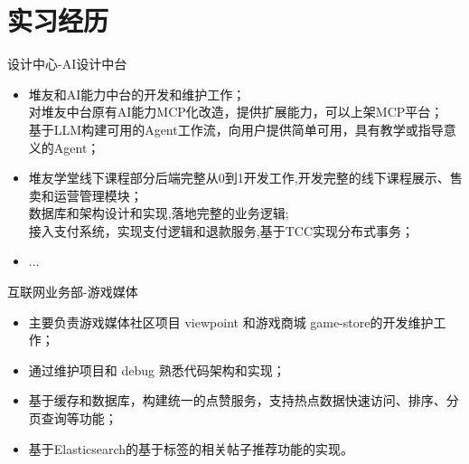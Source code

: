 \documentclass{resume}
\begin{document}
\section{实习经历}
\Content
{{设计中心-AI设计中台}}
{
    \begin{itemize}
        \item 堆友和AI能力中台的开发和维护工作；\\ 对堆友中台原有AI能力MCP化改造，提供扩展能力，可以上架MCP平台；\\ 基于LLM构建可用的Agent工作流，向用户提供简单可用，具有教学或指导意义的Agent；
        \item 堆友学堂线下课程部分后端完整从0到1开发工作,开发完整的线下课程展示、售卖和运营管理模块；\\
        数据库和架构设计和实现,落地完整的业务逻辑;\\
        接入支付系统，实现支付逻辑和退款服务,基于TCC实现分布式事务；
        \item ...
    \end{itemize}
}
\Content
{{互联网业务部-游戏媒体}}
{
    \begin{itemize}
        \item 主要负责游戏媒体社区项目 viewpoint 和游戏商城 game-store的开发维护工作；
        \item 通过维护项目和 debug 熟悉代码架构和实现；
        \item 基于缓存和数据库，构建统一的点赞服务，支持热点数据快速访问、排序、分页查询等功能；
        \item 基于Elasticsearch的基于标签的相关帖子推荐功能的实现。
    \end{itemize}
}

\sepspace
\end{document}
